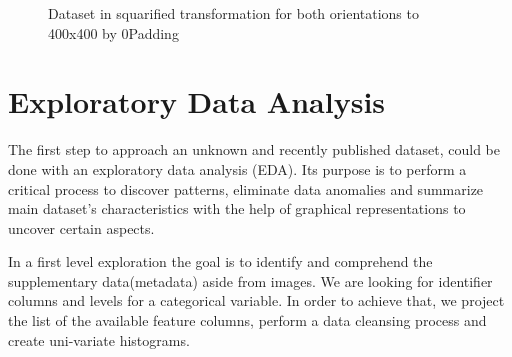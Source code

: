 \begin{figure}[ht!]
    \centering  
    \caption{Dataset in squarified transformation for both orientations to 400x400 by 0Padding}
    \label{c4:square_transformation}
\end{figure}


\section{Exploratory Data Analysis}
\label{c4:eda}

The first step to approach an unknown and recently published dataset, could be done with an exploratory data analysis (EDA). Its purpose is to perform a critical process to discover patterns, eliminate data anomalies and summarize main dataset's characteristics with the help of graphical representations to uncover certain aspects.

In a first level exploration the goal is to identify and comprehend the supplementary data(metadata) aside from images. We are looking for  identifier columns and levels for a categorical variable. In order to achieve that, we project the list of the available feature columns, perform a data cleansing process and create uni-variate histograms.

